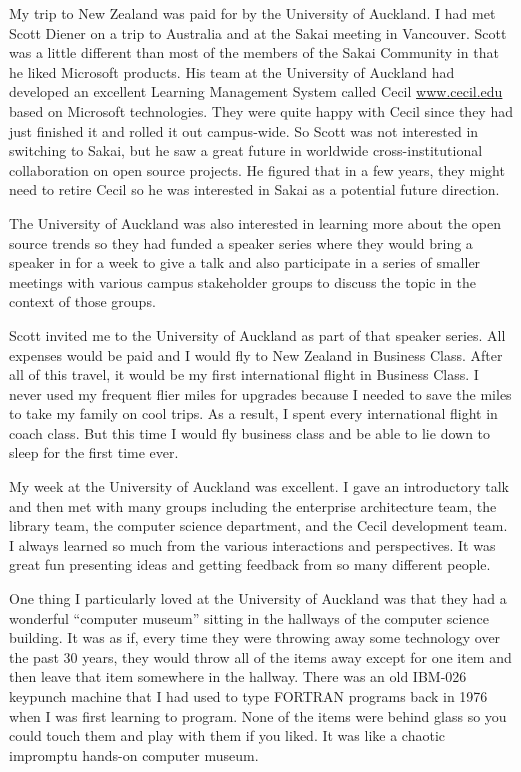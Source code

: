 \documentclass[12pt]{book}
\begin{document}
My trip to New Zealand was paid for by the University
of Auckland.  I had met Scott Diener on a trip to
Australia and at the Sakai meeting in Vancouver.
Scott was a little different than most of the members
of the Sakai Community in that he liked Microsoft
products.   His team at the University of Auckland
had developed an excellent Learning Management System
called Cecil \url{www.cecil.edu} based on Microsoft
technologies.   They were quite happy with Cecil since they
had just finished it and rolled it out campus-wide.
So Scott was not interested in switching to Sakai,
but he saw a great future in worldwide cross-institutional
collaboration on open source projects.  He figured
that in a few years, they might need to retire Cecil
so he was interested in Sakai as a potential
future direction.

The University of Auckland was also interested in learning
more about the open source trends so they had funded
a speaker series where they would bring a speaker in
for a week to give a talk and
also participate in a series of smaller
meetings with various campus stakeholder groups to
discuss the topic in the context of those groups.

Scott invited me to the University of Auckland as part
of that speaker series.  All expenses would be paid and
I would fly to New Zealand in Business Class.  After all of
this travel, it would be my first international flight
in Business Class.  I never used my frequent flier miles
for upgrades because I needed to save the miles to take
my family on cool trips.  As a result, I spent every international
flight in coach class.  But this time I would fly business
class and be able to lie down to sleep for the first time
ever.

My week at the University of Auckland was excellent.  I
gave an introductory talk and then met with many groups
including the enterprise architecture team, the
library team, the computer science department, and
the Cecil development team.   I always learned so much
from the various interactions and perspectives.  It was
great fun presenting ideas and getting feedback from
so many different people.

One thing I particularly loved at the University of Auckland
was that they had a wonderful ``computer museum'' sitting
in the hallways of the computer science building.  It was
as if, every time they were throwing away some technology
over the past 30 years, they would throw all of the items
away except for one item and then leave that item somewhere
in the hallway.  There was an old IBM-026 keypunch machine that I
had used to type FORTRAN programs back in 1976 when I
was first learning to program.  None of the items were behind
glass so you could touch them and play with them if you
liked.   It was like a chaotic impromptu hands-on computer
museum.
\end{document}
